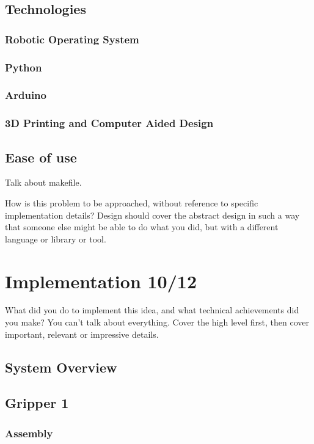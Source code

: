 \documentclass{l4proj}
\begin{document}
\section{Technologies}
\subsection{Robotic Operating System}
\subsection{Python}
\subsection{Arduino} 
\subsection{3D Printing and Computer Aided Design}

\section{Ease of use}
Talk about makefile. 

How is this problem to be approached, without reference to specific implementation details? 
Design should cover the abstract design in such a way that someone else might be able to do what you did, but with a different language or library or tool.

\chapter{Implementation 10/12}
What did you do to implement this idea, and what technical achievements did you make?
You can't talk about everything. Cover the high level first, then cover important, relevant or impressive details.

\section{System Overview}

\section{Gripper 1}
\subsection{Assembly}
\end{document}
